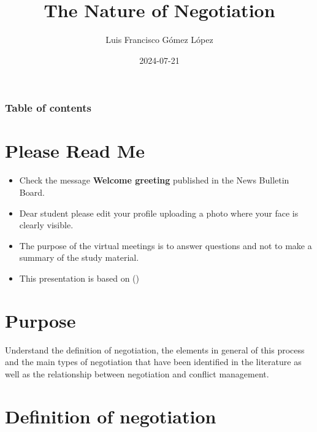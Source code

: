 \documentclass[
  ignorenonframetext,
]{beamer}
\title{The Nature of Negotiation}
\author{Luis Francisco Gómez López}
\date{2024-07-21}
\institute{FAEDIS}
\renewcommand*\contentsname{Table of contents}
\newcommand\contentsname{Table of contents}
\begin{document}
\frame{\titlepage}

\renewcommand*\contentsname{Table of contents}
\begin{frame}[allowframebreaks]
  \frametitle{Table of contents}
  \tableofcontents[hideallsubsections]
\end{frame}

\section{Please Read Me}\label{please-read-me}

\begin{frame}{}
\label{section}
\begin{itemize}
\item
  Check the message \textbf{Welcome greeting} published in the News
  Bulletin Board.
\item
  Dear student please edit your profile uploading a photo where your
  face is clearly visible.
\item
  The purpose of the virtual meetings is to answer questions and not to
  make a summary of the study material.
\item
  This presentation is based on
  ()
\end{itemize}
\end{frame}

\section{Purpose}\label{purpose}

\begin{frame}{}
\label{section-1}
Understand the definition of negotiation, the elements in general of
this process and the main types of negotiation that have been identified
in the literature as well as the relationship between negotiation and
conflict management.
\end{frame}

\section{Definition of negotiation}\label{definition-of-negotiation}
\end{document}
